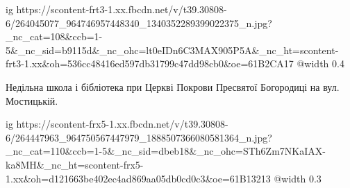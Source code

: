  
 
 
 
 

\ifcmt
  ig https://scontent-frt3-1.xx.fbcdn.net/v/t39.30808-6/264045077_964746957448340_1340352289399022375_n.jpg?_nc_cat=108&ccb=1-5&_nc_sid=b9115d&_nc_ohc=lt0eIDn6C3MAX905P5A&_nc_ht=scontent-frt3-1.xx&oh=536cc48416ed597db31799c47dd98cb0&oe=61B2CA17
  @width 0.4
\fi


Недільна школа і бібліотека при Церкві Покрови Пресвятої Богородиці на
вул. Мостицькій.


\ifcmt
  ig https://scontent-frx5-1.xx.fbcdn.net/v/t39.30808-6/264447963_964750567447979_1888507366080581364_n.jpg?_nc_cat=110&ccb=1-5&_nc_sid=dbeb18&_nc_ohc=STh6Zm7NKaIAX-ka8MH&_nc_ht=scontent-frx5-1.xx&oh=d121663be402ec4ad869aa05db0cd0c3&oe=61B13213
  @width 0.3
\fi
